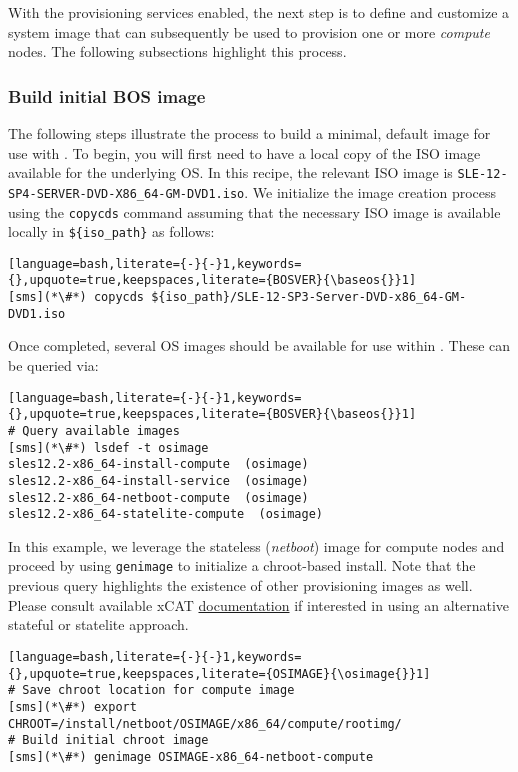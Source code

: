 
With the provisioning services enabled, the next step is to define and customize a system image that can subsequently be
used to provision one or more {\em compute} nodes. The following subsections highlight this process.

\subsubsection{Build initial BOS image} \label{sec:assemble_bos}
The following steps illustrate the process to build a minimal, default image for use with \xCAT{}. To begin, you will
first need to have a local copy of the ISO image available for the underlying OS. In this recipe, the relevant ISO image
is \texttt{SLE-12-SP4-SERVER-DVD-X86\_64-GM-DVD1.iso}. We initialize the image
creation process using the \texttt{copycds} command assuming that the necessary ISO image is available locally in 
\texttt{\$\{iso\_path\}} as follows:

\begin{lstlisting}[language=bash,literate={-}{-}1,keywords={},upquote=true,keepspaces,literate={BOSVER}{\baseos{}}1]
[sms](*\#*) copycds ${iso_path}/SLE-12-SP3-Server-DVD-x86_64-GM-DVD1.iso
\end{lstlisting}

\noindent Once completed, several OS images should be available for use within \xCAT{}. These can be queried via:

\begin{lstlisting}[language=bash,literate={-}{-}1,keywords={},upquote=true,keepspaces,literate={BOSVER}{\baseos{}}1]
# Query available images
[sms](*\#*) lsdef -t osimage
sles12.2-x86_64-install-compute  (osimage)
sles12.2-x86_64-install-service  (osimage)
sles12.2-x86_64-netboot-compute  (osimage)
sles12.2-x86_64-statelite-compute  (osimage)
\end{lstlisting}

In this example, we leverage the stateless ({\em netboot}) image for compute nodes and proceed by using
\texttt{genimage} to initialize a chroot-based install. Note that the previous query highlights the existence of other
provisioning images as well. Please consult available xCAT
\href{https://xcat-docs.readthedocs.io/en/stable/}{\color{blue} documentation} if interested in using an alternative
stateful or statelite approach.
\newpage

\begin{lstlisting}[language=bash,literate={-}{-}1,keywords={},upquote=true,keepspaces,literate={OSIMAGE}{\osimage{}}1]
# Save chroot location for compute image
[sms](*\#*) export CHROOT=/install/netboot/OSIMAGE/x86_64/compute/rootimg/
# Build initial chroot image
[sms](*\#*) genimage OSIMAGE-x86_64-netboot-compute
\end{lstlisting}
